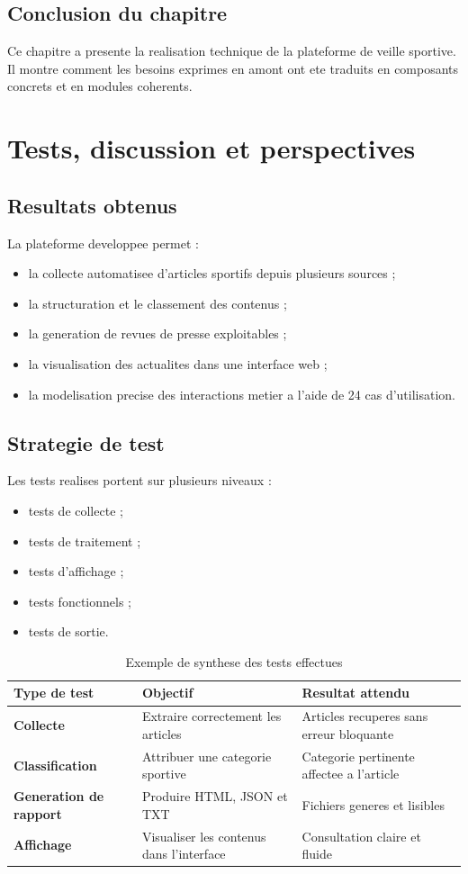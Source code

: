\documentclass[12pt,a4paper,oneside]{report}
\begin{document}
\section{Conclusion du chapitre}
Ce chapitre a presente la realisation technique de la plateforme de veille sportive. Il montre comment les besoins exprimes en amont ont ete traduits en composants concrets et en modules coherents.

\chapter{Tests, discussion et perspectives}

\section{Resultats obtenus}
La plateforme developpee permet :
\begin{itemize}
\item la collecte automatisee d'articles sportifs depuis plusieurs sources ;
\item la structuration et le classement des contenus ;
\item la generation de revues de presse exploitables ;
\item la visualisation des actualites dans une interface web ;
\item la modelisation precise des interactions metier a l'aide de 24 cas d'utilisation.
\end{itemize}

\section{Strategie de test}
Les tests realises portent sur plusieurs niveaux :
\begin{itemize}
\item tests de collecte ;
\item tests de traitement ;
\item tests d'affichage ;
\item tests fonctionnels ;
\item tests de sortie.
\end{itemize}

\begin{table}[H]
\centering
\caption{Exemple de synthese des tests effectues}
\begin{tabular}{>{\bfseries}p{3.5cm}p{5cm}p{4cm}}
\toprule
Type de test & Objectif & Resultat attendu \\
\midrule
Collecte & Extraire correctement les articles & Articles recuperes sans erreur bloquante \\
Classification & Attribuer une categorie sportive & Categorie pertinente affectee a l'article \\
Generation de rapport & Produire HTML, JSON et TXT & Fichiers generes et lisibles \\
Affichage & Visualiser les contenus dans l'interface & Consultation claire et fluide \\
\bottomrule
\end{tabular}
\end{table}
\end{document}
